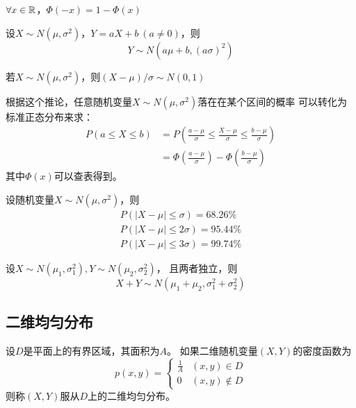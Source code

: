 \begin{theorem}
  $\forall x\in\mathbb{R}$，$\Phi(-x) = 1 - \Phi(x)$
\end{theorem}

\begin{theorem}[正态分布的性质]
  设$X\sim N(\mu,\sigma^2)$，$Y=aX+b\ (a\neq 0)$，则
  \begin{displaymath}
    Y \sim N\left(a\mu+b,(a\sigma)^2\right)
  \end{displaymath}
\end{theorem}

\begin{corollary}[标准化]
  若$X\sim N(\mu,\sigma^2)$，则$(X-\mu)/\sigma \sim N(0,1)$
\end{corollary}

\begin{remark}
  根据这个推论，任意随机变量$X\sim N(\mu,\sigma^2)$落在在某个区间的概率
  可以转化为标准正态分布来求：
  \begin{align*}
    P(a \le X \le b)
    &= P\left(\frac{a-\mu}{\sigma} \le \frac{X-\mu}{\sigma}
      \le \frac{b-\mu}{\sigma}\right) \\
    &= \Phi\left(\frac{a-\mu}{\sigma}\right)
     - \Phi\left(\frac{b-\mu}{\sigma}\right)
  \end{align*}
  其中$\Phi(x)$可以查表得到。
\end{remark}

\begin{theorem}[3$\sigma$原理]
  设随机变量$X\sim N(\mu,\sigma^2)$，则
  \begin{gather*}
    P(|X-\mu|\le\sigma) = 68.26 \% \\
    P(|X-\mu|\le 2\sigma) = 95.44 \% \\
    P(|X-\mu|\le 3\sigma) = 99.74 \%
  \end{gather*}
\end{theorem}

\begin{theorem}[独立正态分布随机变量的和]
  设$X\sim N(\mu_1,\sigma_1^2), Y\sim N(\mu_2,\sigma_2^2)$，
  且两者独立，则
  \begin{displaymath}
    X + Y \sim N(\mu_1+\mu_2, \sigma_1^2+\sigma_2^2)
  \end{displaymath}
\end{theorem}

\subsection{二维均匀分布}
\begin{definition}[二维均匀分布]
  设$D$是平面上的有界区域，其面积为$A$。
  如果二维随机变量$(X,Y)$的密度函数为
  \begin{displaymath}
    p(x,y) = \begin{cases}
      \frac{1}{A} & (x,y)\in D \\
      0 & (x,y)\notin D
    \end{cases}
  \end{displaymath}
  则称$(X,Y)$服从$D$上的二维均匀分布。
\end{definition}

